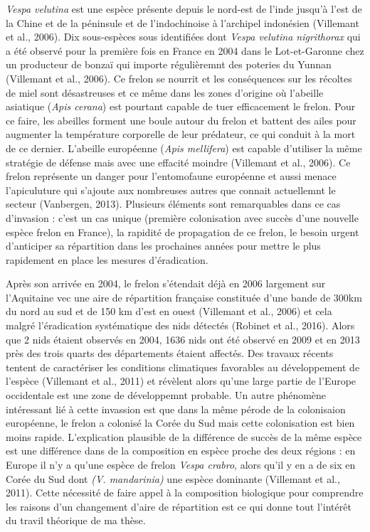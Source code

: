 \emph{Vespa velutina} est une espèce présente depuis le nord-est de
l'inde jusqu'à l'est de la Chine et de la péninsule et de l'indochinoise
à l'archipel indonésien (Villemant et al., 2006). Dix sous-espèces sous
identifiées dont \emph{Vespa velutina nigrithorax} qui a été observé
pour la première fois en France en 2004 dans le Lot-et-Garonne chez un
producteur de bonzaï qui importe régulièremnt des poteries du Yunnan
(Villemant et al., 2006). Ce frelon se nourrit et les conséquences sur
les récoltes de miel sont désastreuses et ce même dans les zones
d'origine où l'abeille asiatique (\emph{Apis cerana}) est pourtant
capable de tuer efficacement le frelon. Pour ce faire, les abeilles
forment une boule autour du frelon et battent des ailes pour augmenter
la température corporelle de leur prédateur, ce qui conduit à la mort de
ce dernier. L'abeille européenne (\emph{Apis mellifera}) est capable
d'utiliser la même stratégie de défense mais avec une effacité moindre
(Villemant et al., 2006). Ce frelon représente un danger pour
l'entomofaune européenne et aussi menace l'apiculuture qui s'ajoute aux
nombreuses autres que connait actuellemnt le secteur (Vanbergen, 2013).
Plusieurs éléments sont remarquables dans ce cas d'invasion : c'est un
cas unique (première colonisation avec succès d'une nouvelle espèce
frelon en France), la rapidité de propagation de ce frelon, le besoin
urgent d'anticiper sa répartition dans les prochaines années pour mettre
le plus rapidement en place les mesures d'éradication.

Après son arrivée en 2004, le frelon s'étendait déjà en 2006 largement
sur l'Aquitaine vec une aire de répartition française constituée d'une
bande de 300km du nord au sud et de 150 km d'est en ouest (Villemant et
al., 2006) et cela malgré l'éradication systématique des nids détectés
(Robinet et al., 2016). Alors que 2 nids étaient observés en 2004, 1636
nids ont été observé en 2009 et en 2013 près des trois quarts des
départements étaient affectés. Des travaux récents tentent de
caractériser les conditions climatiques favorables au développement de
l'espèce (Villemant et al., 2011) et révèlent alors qu'une large partie
de l'Europe occidentale est une zone de développemnt probable. Un autre
phénomène intéressant lié à cette invassion est que dans la même pérode
de la colonisaion européenne, le frelon a colonisé la Corée du Sud mais
cette colonisation est bien moins rapide. L'explication plausible de la
différence de succès de la même espèce est une différence dans de la
composition en espèce proche des deux régions : en Europe il n'y a
qu'une espèce de frelon \emph{Vespa crabro}, alors qu'il y en a de six
en Corée du Sud dont \emph{(V. mandarinia)} une espèce dominante
(Villemant et al., 2011). Cette nécessité de faire appel à la
composition biologique pour comprendre les raisons d'un changement
d'aire de répartition est ce qui donne tout l'intérêt du travil
théorique de ma thèse.

